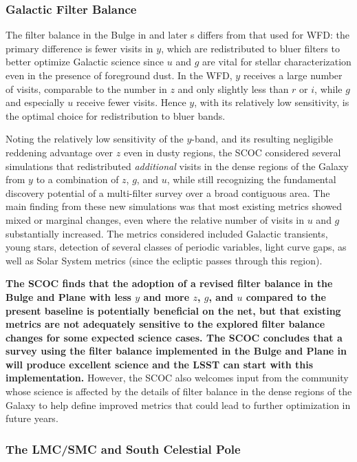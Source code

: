 \subsubsection{Galactic Filter Balance}\label{sec:subG:filterbalance}

The filter balance in the Bulge in  and later \opsim s differs from that used for WFD: the primary difference is fewer visits in $y$, which are redistributed to bluer filters to better optimize Galactic science since $u$ and $g$ are vital for stellar characterization even in the presence of foreground dust. In the WFD, $y$ receives a large number of visits, comparable to the number in $z$ and only slightly less than $r$ or $i$, while $g$ and especially $u$ receive fewer visits. Hence $y$, with its relatively low sensitivity, is the optimal choice for redistribution to bluer bands.

Noting the relatively low sensitivity of the $y$-band, and its resulting negligible reddening advantage over $z$ even in dusty regions, the SCOC considered several simulations that redistributed {\it additional} visits in the dense regions of the Galaxy from $y$ to a combination of $z$, $g$, and $u$, while still recognizing the fundamental discovery potential of a multi-filter survey over a broad contiguous area. The main finding from these new simulations was that most existing metrics showed mixed or marginal changes, even where the relative number of visits in $u$ and $g$ substantially increased. The metrics considered included Galactic transients, young stars, detection of several classes of periodic variables, light curve gaps, as well as Solar System metrics (since the ecliptic passes through this region).

{\bf The SCOC finds that the adoption of a revised filter balance in the Bulge and Plane with less $y$ and more $z$, $g$, and $u$ compared to the present baseline is potentially beneficial on the net, but that existing metrics are not adequately sensitive to the explored filter balance changes for some expected science cases. The SCOC concludes that a survey using the filter balance implemented in the Bulge and Plane in  will produce excellent science and the LSST can start with this implementation.} 
However, the SCOC also welcomes input from the community whose science is affected by the details of filter balance in the dense regions of the Galaxy to help define improved metrics that could lead to further optimization in future years.


\subsubsection{The LMC/SMC and South Celestial Pole}\label{sec:subG:specialregions}

